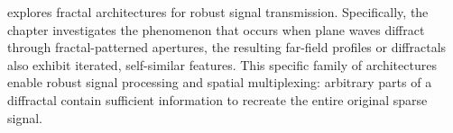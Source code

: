 explores fractal architectures for robust signal transmission. Specifically, the chapter investigates the phenomenon that occurs when plane waves diffract through fractal-patterned apertures, the resulting far-field profiles or diffractals also exhibit iterated, self-similar features. This specific family of architectures enable robust signal processing and spatial multiplexing: arbitrary parts of a diffractal contain sufficient information to recreate the entire original sparse signal.
